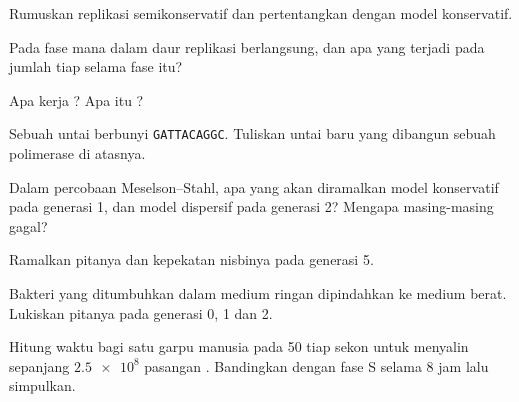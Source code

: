 \begin{exercise}[$\star$]\label{exo:g11:dna-replication:2}
Rumuskan replikasi semikonservatif dan pertentangkan dengan model
konservatif.
\end{exercise}

\begin{exercise}[$\star$]\label{exo:g11:dna-replication:3}
Pada fase mana dalam daur  replikasi berlangsung, dan apa yang
terjadi pada jumlah  tiap  selama fase itu?
\end{exercise}

\begin{exercise}[$\star$]\label{exo:g11:dna-replication:4}
Apa kerja ? Apa itu ?
\end{exercise}

\begin{exercise}[$\star$]\label{exo:g11:dna-replication:5}
Sebuah untai berbunyi \texttt{GATTACAGGC}. Tuliskan untai baru yang
dibangun sebuah polimerase di atasnya.
\end{exercise}

\begin{exercise}[$\star\star$]\label{exo:g11:dna-replication:6}
Dalam percobaan Meselson--Stahl, apa yang akan diramalkan model
konservatif pada generasi 1, dan model dispersif pada generasi 2?
Mengapa masing-masing gagal?
\end{exercise}

\begin{exercise}[$\star\star$]\label{exo:g11:dna-replication:7}
Ramalkan pitanya dan kepekatan nisbinya pada generasi 5.
\end{exercise}

\begin{exercise}[$\star\star$]\label{exo:g11:dna-replication:8}
Bakteri yang ditumbuhkan dalam medium ringan dipindahkan ke medium
berat. Lukiskan pitanya pada generasi 0, 1 dan 2.
\end{exercise}

\begin{exercise}[$\star\star$]\label{exo:g11:dna-replication:9}
Hitung waktu bagi satu garpu manusia pada 50  tiap sekon
untuk menyalin  sepanjang $\num{2.5e8}$ pasangan .
Bandingkan dengan fase S selama 8 jam lalu simpulkan.
\end{exercise}

